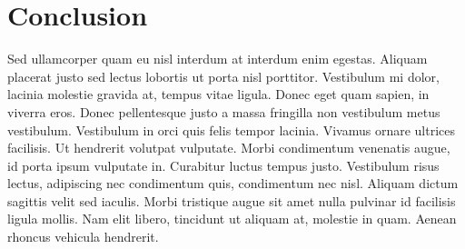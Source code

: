 \section{Conclusion}

Sed ullamcorper quam eu nisl interdum at interdum enim egestas. Aliquam placerat justo sed lectus lobortis ut porta nisl porttitor. Vestibulum mi dolor, lacinia molestie gravida at, tempus vitae ligula. Donec eget quam sapien, in viverra eros. Donec pellentesque justo a massa fringilla non vestibulum metus vestibulum. Vestibulum in orci quis felis tempor lacinia. Vivamus ornare ultrices facilisis. Ut hendrerit volutpat vulputate. Morbi condimentum venenatis augue, id porta ipsum vulputate in. Curabitur luctus tempus justo. Vestibulum risus lectus, adipiscing nec condimentum quis, condimentum nec nisl. Aliquam dictum sagittis velit sed iaculis. Morbi tristique augue sit amet nulla pulvinar id facilisis ligula mollis. Nam elit libero, tincidunt ut aliquam at, molestie in quam. Aenean rhoncus vehicula hendrerit.
